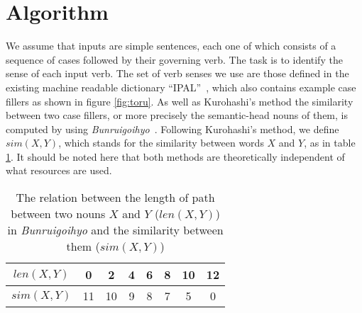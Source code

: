 \section{Algorithm}
\label{sec:algorithm}

\hspace{0.2mm}We\hspace{0.1mm} assume\hspace{0.1mm} that\hspace{0.1mm} inputs\hspace{0.1mm} are\hspace{0.1mm} simple\hspace{0.1mm} sentences, \hspace{0.1mm}each\hspace{0.1mm} one\hspace{0.1mm} of\hspace{0.1mm} which\hspace{0.1mm} consists\hspace{0.1mm} of\hspace{0.1mm} a \hspace{0.1mm}sequence of cases followed by their governing verb.  The task is
to identify the sense of each input verb.  The set of verb senses we
use are those defined in the existing machine readable dictionary
``IPAL''~\cite{ipal:87}, which also contains example case fillers as
shown in figure \ref{fig:toru}.  As well as Kurohashi's method the
similarity between two case fillers, or more precisely the
semantic-head nouns of them, is computed by using {\it
  Bunruigoihyo\/}~\cite{bgh:64}. Following Kurohashi's method, we
define $sim(X,Y)$, which stands for the similarity between words $X$
and $Y$, as in table \ref{tab:kuro}. It should be noted here that both
methods are theoretically independent of what resources are used.

\begin{table}[tbp]
  \caption{The relation between the length of path between two nouns $X$
    and $Y$ ($len(X,Y)$) \\ in {\it Bunruigoihyo\/} and the similarity
    between them ($sim(X,Y)$)}
  \label{tab:kuro}
  \begin{center}
    \leavevmode
    \begin{tabular}{|c|ccccccc|} \hline
      $len(X,Y)$ & 0 & 2 & 4 & 6 & 8 & 10 & 12 \\ \hline
      $sim(X,Y)$ & 11 & 10 & 9 & 8 & 7 & 5 & 0 \\ \hline
    \end{tabular}
  \end{center}
\end{table}

